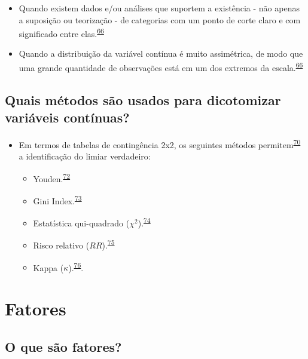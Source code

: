 \documentclass[
  a4paper,
]{book}
\begin{document}
\begin{itemize}
\item
  Quando existem dados e/ou análises que suportem a existência - não apenas a suposição ou teorização - de categorias com um ponto de corte claro e com significado entre elas.\textsuperscript{\protect\hyperlink{ref-MacCallum2002}{66}}
\item
  Quando a distribuição da variável contínua é muito assimétrica, de modo que uma grande quantidade de observações está em um dos extremos da escala.\textsuperscript{\protect\hyperlink{ref-MacCallum2002}{66}}
\end{itemize}

\hypertarget{quais-muxe9todos-suxe3o-usados-para-dicotomizar-variuxe1veis-contuxednuas}{%
\subsection{Quais métodos são usados para dicotomizar variáveis contínuas?}\label{quais-muxe9todos-suxe3o-usados-para-dicotomizar-variuxe1veis-contuxednuas}}

\begin{itemize}
\item
  Em termos de tabelas de contingência 2x2, os seguintes métodos permitem\textsuperscript{\protect\hyperlink{ref-Prince2017}{70}} a identificação do limiar verdadeiro:

  \begin{itemize}
  \item
    Youden.\textsuperscript{\protect\hyperlink{ref-YOUDEN1950}{72}}
  \item
    Gini Index.\textsuperscript{\protect\hyperlink{ref-strobl2007}{73}}
  \item
    Estatística qui-quadrado (\(\chi^2\)).\textsuperscript{\protect\hyperlink{ref-pearson1900}{74}}
  \item
    Risco relativo (\(RR\)).\textsuperscript{\protect\hyperlink{ref-Greiner2000}{75}}
  \item
    Kappa (\(\kappa\)).\textsuperscript{\protect\hyperlink{ref-fleiss1971}{76}}.
  \end{itemize}
\end{itemize}

\hypertarget{fatores}{%
\section{Fatores}\label{fatores}}

\hypertarget{o-que-suxe3o-fatores}{%
\subsection{O que são fatores?}\label{o-que-suxe3o-fatores}}
\end{document}
